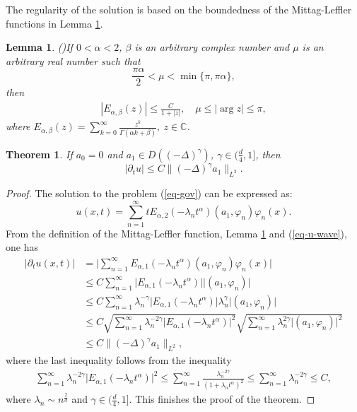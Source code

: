 \documentclass[11pt]{article}
\newtheorem{theorem}{Theorem}
\newtheorem{lemma}{Lemma}[section]
\numberwithin{equation}{section}
\begin{document}
The regularity of the solution is based on the boundedness of the Mittag-Leffler functions in Lemma \ref{lem-ml-asymp}. 
\begin{lemma}(\cite{podlubny1998fract})\label{lem-ml-asymp}
If $0<\alpha<2$, $\beta$ is an arbitrary complex number and $\mu$ is an arbitrary real number such that
$$
  \frac{\pi\alpha}2 <\mu<\min\{\pi,\pi\alpha\},
$$
then
\begin{align*}
|E_{\alpha,\beta}(z)| \le \frac{C}{1+|z|} ,\quad  \mu\le |\arg z|\le\pi,    
\end{align*}
where $E_{\alpha,\beta}(z) = \sum_{k=0}^{\infty} \frac{z^k}{\Gamma(\alpha k + \beta)}, ~ z \in \mathbb{C}$.
\end{lemma}


\begin{theorem}\label{thm-reg-maxi-1}
If $a_0=0$ and $a_1\in D((-\Delta)^{\gamma})$, $\gamma\in(\frac{d}{4},1]$, then
\[
|\partial _tu| \leq C\|(-\Delta)^{\gamma}a_1\|_{L^2}.
\]
\end{theorem}
\begin{proof}
The solution to the problem (\ref{eq-gov}) can be expressed as:
\begin{equation}\label{eq-u-wave}
  u(x,t) = \sum_{n=1}^{\infty} t E_{\alpha,2}(-\lambda_n t^\alpha)(a_1, \varphi_n) \varphi_n(x).
\end{equation}
From the definition of the Mittag-Leffler function, Lemma \ref{lem-ml-asymp} and (\ref{eq-u-wave}), one has
\begin{align*}
|\partial_tu(x,t)|
& = \bigg|\sum_{n=1}^{\infty}  E_{\alpha,1}(-\lambda_n t^\alpha)(a_1, \varphi_n) \varphi_n(x)\bigg|\\
& \le C\sum_{n=1}^{\infty}  \big|E_{\alpha,1}(-\lambda_n t^\alpha)\big|\big|(a_1, \varphi_n) \big|\\
& \le C\sum_{n=1}^{\infty} \lambda_n^{-\gamma}\big|E_{\alpha,1}(-\lambda_nt^\alpha)\big|\lambda_n^\gamma\big|(a_1, \varphi_n) \big|\\
& \le C\sqrt{\sum_{n=1}^{\infty} \lambda_n^{-2\gamma}\big|E_{\alpha,1}(-\lambda_nt^\alpha)\big|^2}\sqrt{\sum_{n=1}^{\infty}\lambda_n^{2\gamma}\big|(a_1, \varphi_n) \big|^2}\\
& \le C\|(-\Delta)^{\gamma}a_1\|_{L^2},
\end{align*}
where the last inequality follows from the inequality
\begin{align*}
\sum_{n=1}^{\infty} \lambda_n^{-2\gamma}\big|E_{\alpha,1}(-\lambda_nt^\alpha)\big|^2\le \sum_{n=1}^{\infty} \frac{\lambda_n^{-2\gamma}}{(1+\lambda_nt^\alpha)^2}\le \sum_{n=1}^{\infty} \lambda_n^{-2\gamma} \le C,\end{align*} 
where $\lambda_n\sim n^{\frac{2}{d}}$ and $\gamma\in(\frac{d}{4},1]$. This finishes the proof of the theorem.
\end{proof}
\end{document}
